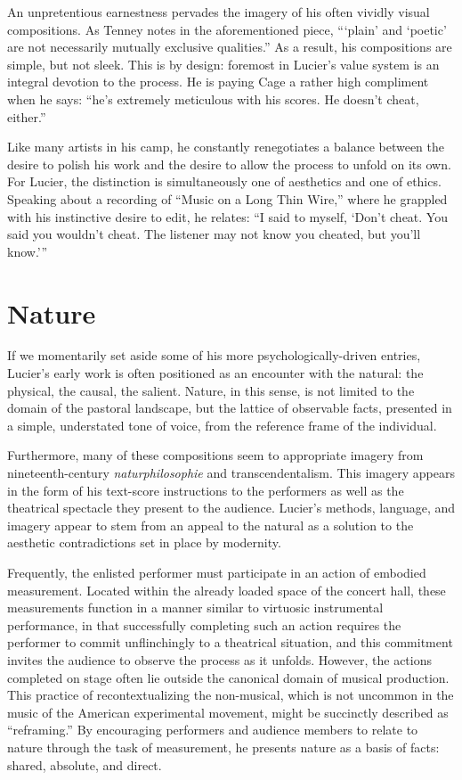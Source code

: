 \documentclass[a4paper,10pt]{report}
\numberwithin{equation}{section}
\begin{document}
An unpretentious earnestness pervades the imagery of his often vividly visual compositions. As Tenney notes in the aforementioned piece, ```plain' and `poetic' are not necessarily mutually exclusive qualities.''\cite[p.~16]{lucier1995} As a result, his compositions are simple, but not sleek. This is by design: foremost in Lucier's value system is an integral devotion to the process. He is paying Cage a rather high compliment when he says: ``he's extremely meticulous with his scores. He doesn't cheat, either.''\cite[p.~11]{lucier2012} 

Like many artists in his camp, he constantly renegotiates a balance between the desire to polish his work and the desire to allow the process to unfold on its own. For Lucier, the distinction is simultaneously one of aesthetics and one of ethics. Speaking about a recording of ``Music on a Long Thin Wire,'' where he grappled with his instinctive desire to edit, he relates: ``I said to myself, `Don't cheat. You said you wouldn't cheat. The listener may not know you cheated, but you'll know.'''\cite[p.~530]{lucier1995} 

\section{Nature}
If we momentarily set aside some of his more psychologically-driven entries, Lucier's early work is often positioned as an encounter with the natural: the physical, the causal, the salient. Nature, in this sense, is not limited to the domain of the pastoral landscape, but the lattice of observable facts, presented in a simple, understated tone of voice, from the reference frame of the individual. 

Furthermore, many of these compositions seem to appropriate imagery from nineteenth-century \emph{naturphilosophie} and transcendentalism. This imagery appears in the form of his text-score instructions to the performers as well as the theatrical spectacle they present to the audience. Lucier's methods, language, and imagery appear to stem from an appeal to the natural as a solution to the aesthetic contradictions set in place by modernity. 

Frequently, the enlisted performer must participate in an action of embodied measurement. Located within the already loaded space of the concert hall, these measurements function in a manner similar to virtuosic instrumental performance, in that successfully completing such an action requires the performer to commit unflinchingly to a theatrical situation, and this commitment invites the audience to observe the process as it unfolds. However, the actions completed on stage often lie outside the canonical domain of musical production. This practice of recontextualizing the non-musical, which is not uncommon in the music of the American experimental movement, might be succinctly described as “reframing.”\cite{dewar2012} By encouraging performers and audience members to relate to nature through the task of measurement, he presents nature as a basis of facts: shared, absolute, and direct. 
\end{document}
